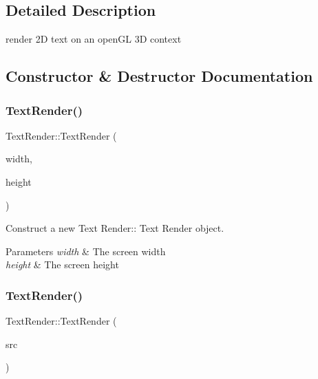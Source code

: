 \subsection{Detailed Description}
render 2D text on an open\+GL 3D context 

\subsection{Constructor \& Destructor Documentation}
\mbox{\label{class_text_render_a57d8bcb3c499312eaf9752b340066e2b}} 
\subsubsection{\texorpdfstring{Text\+Render()}{TextRender()}\hspace{0.1cm}{\footnotesize\ttfamily [1/2]}}
{\footnotesize\ttfamily Text\+Render\+::\+Text\+Render (\begin{DoxyParamCaption}\item[{uint32\+\_\+t}]{width,  }\item[{uint32\+\_\+t}]{height }\end{DoxyParamCaption})}



Construct a new Text Render\+:\+: Text Render object. 


\begin{DoxyParams}{Parameters}
{\em width} & The screen width \\
\hline
{\em height} & The screen height \\
\hline
\end{DoxyParams}
\mbox{\label{class_text_render_a019cb58785504de382da100b05a06a36}} 
\subsubsection{\texorpdfstring{Text\+Render()}{TextRender()}\hspace{0.1cm}{\footnotesize\ttfamily [2/2]}}
{\footnotesize\ttfamily Text\+Render\+::\+Text\+Render (\begin{DoxyParamCaption}\item[{\hyperlink{class_text_render}{Text\+Render} const \&}]{src }\end{DoxyParamCaption})}



